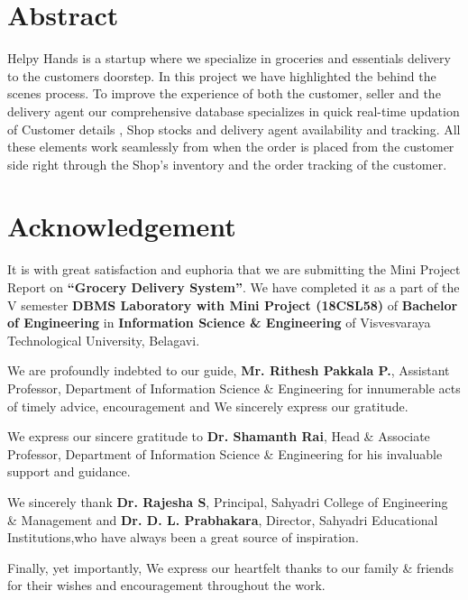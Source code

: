 \documentclass[12pt,a4paper]{report}
\begin{document}
\newpage
\pagestyle{plain}
\chapter*{Abstract}
Helpy Hands is a startup where we specialize in groceries and essentials 
delivery to the customers doorstep. In this project we have highlighted the behind the scenes process. To improve 
the experience of both the customer, seller and the delivery agent our comprehensive database specializes in quick 
real-time updation of Customer details , Shop stocks and delivery agent availability and tracking. All these 
elements work seamlessly from when the order is placed from the customer side right through the Shop's inventory 
and the order tracking of the customer.
\chapter*{Acknowledgement}
It is with great satisfaction and euphoria that we are submitting the Mini Project Report on \textbf{“Grocery Delivery System”}. We have completed it as a part of the V semester \textbf{DBMS Laboratory with Mini Project (18CSL58)} of \textbf{Bachelor of Engineering} in \textbf{Information Science \& Engineering} of Visvesvaraya Technological University, Belagavi.
\par
\vspace{0.15in}
\noindent We are profoundly indebted to our guide, \textbf{Mr. Rithesh Pakkala P.}, Assistant Professor, Department of Information Science \& Engineering for innumerable acts of timely advice, encouragement and We sincerely express our gratitude.
\par
\vspace{0.15in}
\noindent We express our sincere gratitude to \textbf{Dr. Shamanth Rai}, Head \& Associate Professor, Department of Information Science \& Engineering for his invaluable support and guidance.
\par
\vspace{0.15in}
\noindent We sincerely thank  \textbf{Dr. Rajesha S}, Principal, Sahyadri College of Engineering \& Management  and \textbf{Dr. D. L. Prabhakara}, Director, Sahyadri Educational Institutions,who have always been a great source of inspiration.
\par
\vspace{0.15in}
\noindent Finally, yet importantly, We express our heartfelt thanks to our family \& friends for their wishes and encouragement throughout the work.
\\
\\
\end{document}
